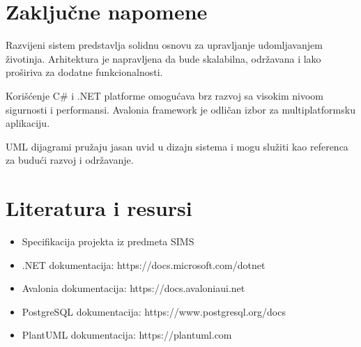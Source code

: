 \section{Zaključne napomene}

Razvijeni sistem predstavlja solidnu osnovu za upravljanje udomljavanjem životinja. Arhitektura je napravljena da bude skalabilna, održavana i lako proširiva za dodatne funkcionalnosti.

Korišćenje C\# i .NET platforme omogućava brz razvoj sa visokim nivoom sigurnosti i performansi. Avalonia framework je odličan izbor za multiplatformsku aplikaciju.

UML dijagrami pružaju jasan uvid u dizajn sistema i mogu služiti kao referenca za budući razvoj i održavanje.

\section{Literatura i resursi}

\begin{itemize}
    \item Specifikacija projekta iz predmeta SIMS
    \item .NET dokumentacija: https://docs.microsoft.com/dotnet
    \item Avalonia dokumentacija: https://docs.avaloniaui.net
    \item PostgreSQL dokumentacija: https://www.postgresql.org/docs
    \item PlantUML dokumentacija: https://plantuml.com
\end{itemize}

\vspace{2cm}


